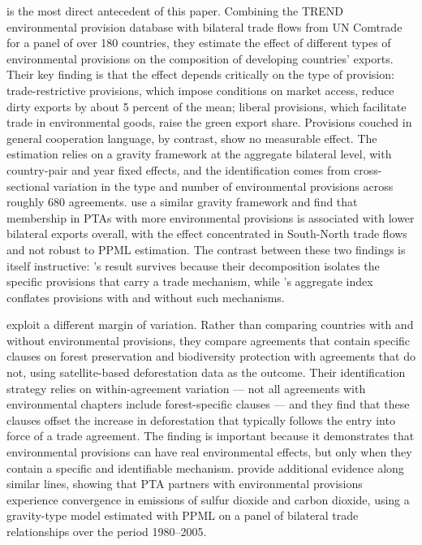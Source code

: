 \documentclass[12pt]{article}
\begin{document}
\citet{brandi2020} is the most direct antecedent of this paper. Combining the TREND environmental provision database \citep{morin2018} with bilateral trade flows from UN Comtrade for a panel of over 180 countries, they estimate the effect of different types of environmental provisions on the composition of developing countries' exports. Their key finding is that the effect depends critically on the type of provision: trade-restrictive provisions, which impose conditions on market access, reduce dirty exports by about 5 percent of the mean; liberal provisions, which facilitate trade in environmental goods, raise the green export share. Provisions couched in general cooperation language, by contrast, show no measurable effect. The estimation relies on a gravity framework at the aggregate bilateral level, with country-pair and year fixed effects, and the identification comes from cross-sectional variation in the type and number of environmental provisions across roughly 680 agreements. \citet{berger2020} use a similar gravity framework and find that membership in PTAs with more environmental provisions is associated with lower bilateral exports overall, with the effect concentrated in South-North trade flows and not robust to PPML estimation. The contrast between these two findings is itself instructive: \citet{brandi2020}'s result survives because their decomposition isolates the specific provisions that carry a trade mechanism, while \citet{berger2020}'s aggregate index conflates provisions with and without such mechanisms.

\citet{abman2024} exploit a different margin of variation. Rather than comparing countries with and without environmental provisions, they compare agreements that contain specific clauses on forest preservation and biodiversity protection with agreements that do not, using satellite-based deforestation data as the outcome. Their identification strategy relies on within-agreement variation --- not all agreements with environmental chapters include forest-specific clauses --- and they find that these clauses offset the increase in deforestation that typically follows the entry into force of a trade agreement. The finding is important because it demonstrates that environmental provisions can have real environmental effects, but only when they contain a specific and identifiable mechanism. \citet{baghdadi2013} provide additional evidence along similar lines, showing that PTA partners with environmental provisions experience convergence in emissions of sulfur dioxide and carbon dioxide, using a gravity-type model estimated with PPML on a panel of bilateral trade relationships over the period 1980--2005.
\end{document}
